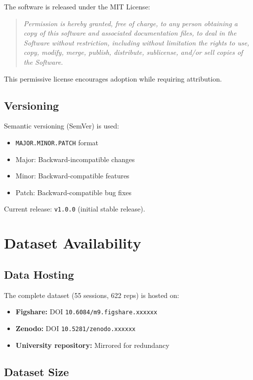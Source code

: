 The software is released under the MIT License:

\begin{quote}
\textit{Permission is hereby granted, free of charge, to any person obtaining a copy of this software and associated documentation files, to deal in the Software without restriction, including without limitation the rights to use, copy, modify, merge, publish, distribute, sublicense, and/or sell copies of the Software.}
\end{quote}

This permissive license encourages adoption while requiring attribution.

\subsection{Versioning}

Semantic versioning (SemVer) is used:
\begin{itemize}
    \item \texttt{MAJOR.MINOR.PATCH} format
    \item Major: Backward-incompatible changes
    \item Minor: Backward-compatible features
    \item Patch: Backward-compatible bug fixes
\end{itemize}

Current release: \texttt{v1.0.0} (initial stable release).

\section{Dataset Availability}

\subsection{Data Hosting}

The complete dataset (55 sessions, 622 reps) is hosted on:
\begin{itemize}
    \item \textbf{Figshare:} DOI \texttt{10.6084/m9.figshare.xxxxxx}
    \item \textbf{Zenodo:} DOI \texttt{10.5281/zenodo.xxxxxx}
    \item \textbf{University repository:} Mirrored for redundancy
\end{itemize}

\subsection{Dataset Size}

